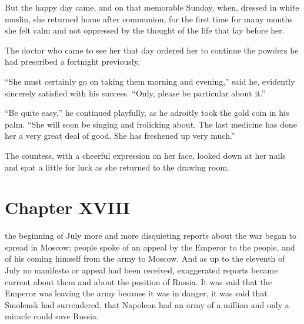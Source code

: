 But the happy day came, and on that memorable Sunday, when,
dressed in white muslin, she returned home after communion, for
the first time for many months she felt calm and not oppressed by
the thought of the life that lay before her.

The doctor who came to see her that day ordered her to continue
the powders he had prescribed a fortnight previously.

``She must certainly go on taking them morning and evening,''
said he, evidently sincerely satisfied with his success. ``Only,
please be particular about it.''

``Be quite easy,'' he continued playfully, as he adroitly took
the gold coin in his palm. ``She will soon be singing and
frolicking about. The last medicine has done her a very great
deal of good. She has freshened up very much.''

The countess, with a cheerful expression on her face, looked down
at her nails and spat a little for luck as she returned to the
drawing room.


\chapter*{Chapter XVIII}
\ifaudio     
{} 
\fi

 the beginning of July more and more disquieting reports about
the war began to spread in Moscow; people spoke of an appeal by
the Emperor to the people, and of his coming himself from the
army to Moscow. And as up to the eleventh of July no manifesto or
appeal had been received, exaggerated reports became current
about them and about the position of Russia. It was said that the
Emperor was leaving the army because it was in danger, it was
said that Smolensk had surrendered, that Napoleon had an army of
a million and only a miracle could save Russia.

